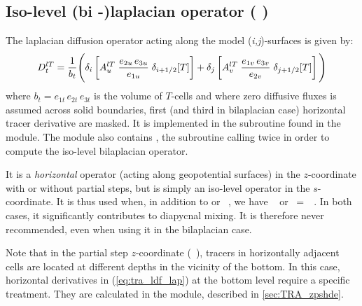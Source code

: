 \documentclass[../main/NEMO_manual]{subfiles}
\begin{document}
\subsection{Iso-level (bi -)laplacian operator ( \protect{}) }
\label{subsec:TRA_ldf_lev}

The laplacian diffusion operator acting along the model (\textit{i,j})-surfaces is given by: 
\begin{equation}
  \label{eq:tra_ldf_lap}
  D_t^{lT} = \frac{1}{b_t} \Bigg(   \delta_{i} \left[ A_u^{lT} \; \frac{e_{2u} \, e_{3u}}{e_{1u}} \; \delta_{i + 1/2} [T] \right]
                                  + \delta_{j} \left[ A_v^{lT} \; \frac{e_{1v} \, e_{3v}}{e_{2v}} \; \delta_{j + 1/2} [T] \right] \Bigg)
\end{equation}
where $b_t = e_{1t} \, e_{2t} \, e_{3t}$  is the volume of $T$-cells and
where zero diffusive fluxes is assumed across solid boundaries,
first (and third in bilaplacian case) horizontal tracer derivative are masked.
It is implemented in the  subroutine found in the  module.
The module also contains , the subroutine calling twice  in order to
compute the iso-level bilaplacian operator.

It is a \textit{horizontal} operator (\ie acting along geopotential surfaces) in
the $z$-coordinate with or without partial steps, but is simply an iso-level operator in the $s$-coordinate.
It is thus used when, in addition to  or ~,
we have ~ or ~=~~.
In both cases, it significantly contributes to diapycnal mixing.
It is therefore never recommended, even when using it in the bilaplacian case.

Note that in the partial step $z$-coordinate (~),
tracers in horizontally adjacent cells are located at different depths in the vicinity of the bottom.
In this case, horizontal derivatives in (\autoref{eq:tra_ldf_lap}) at the bottom level require a specific treatment.
They are calculated in the  module, described in \autoref{sec:TRA_zpshde}.

\end{document}
